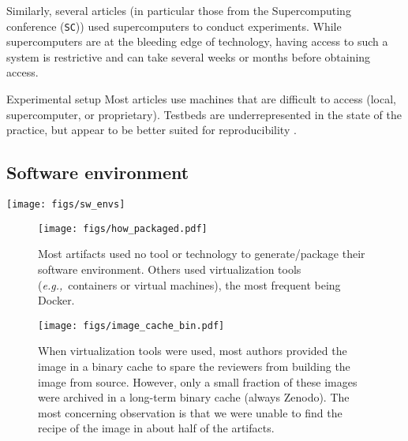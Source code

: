 \documentclass[sigconf,natbib=false]{acmart}
\newcommand{\eg}{\emph{e.g.,}}
\newcommand{\ad}{Artifact Description}
\newcommand{\aeval}{Artifact Evaluation}
\begin{document}
Similarly, several articles (in particular those from the Supercomputing conference (\texttt{SC})) used supercomputers to conduct experiments.
While supercomputers are at the bleeding edge of technology, having access to such a system is restrictive and can take several weeks or months before obtaining access.

\begin{lesson}{Experimental setup}{}
  Most articles use machines that are difficult to access (local, supercomputer, or proprietary). 
  Testbeds are underrepresented in the state of the practice, but appear to be better suited for reproducibility \cite{nussbaum2017testbeds}.
\end{lesson}

\subsection{Software environment}\label{sec:sop:sw}

\begin{figure*}
  \centering
  \texttt{[image: figs/sw\_envs]}
  \caption{Techniques used to share the software environment in the \ad s. Note that an article may use several such techniques.
  }
  \label{fig:sw_envs}
\end{figure*}

\begin{figure*}
  \centering
  \begin{subfigure}{0.49\textwidth}
    \centering
    \texttt{[image: figs/how\_packaged.pdf]}
    \caption{Most artifacts used no tool or technology to generate/package their software environment.
    Others used virtualization tools (\eg\ containers or virtual machines), the most frequent being Docker.
    }
    \label{fig:techno}
  \end{subfigure}
  \hfill
  \begin{subfigure}{0.49\textwidth}
      \centering
      \texttt{[image: figs/image\_cache\_bin.pdf]}
    \caption{When virtualization tools were used, most authors provided the image in a binary cache to spare the reviewers from building the image from source.
    However, only a small fraction of these images were archived in a long-term binary cache (always Zenodo).
    The most concerning observation is that we were unable to find the recipe of the image in about half of the artifacts.
    }
    \label{fig:cache_bin}
  \end{subfigure}
  \caption{Tools and technologies used to generate and package the software environment for the \aeval\ (Figure \ref{fig:techno}), and the state of the image and its recipe in the case of virtual tools (Figure \ref{fig:cache_bin}).}\label{fig:techo_cache}
\end{figure*}
\end{document}
